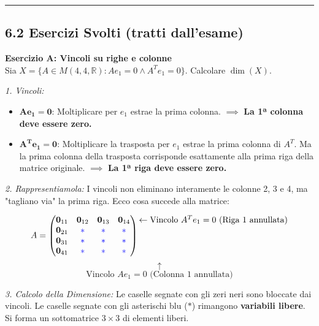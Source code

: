 \documentclass[10pt,a4paper]{article}
\begin{document}
\vspace{0.4cm}
\hrule
\vspace{0.4cm}

\subsection*{6.2 Esercizi Svolti (tratti dall'esame)}

\textbf{Esercizio A: Vincoli su righe e colonne}
\\ Sia $X = \{ A \in M(4,4, \mathbb{R}) : A e_1 = 0 \land A^T e_1 = 0 \}$. Calcolare $\dim(X)$.

\textit{1. Vincoli:}
\begin{itemize}
    \item $\mathbf{A e_1 = 0}$:
    Moltiplicare per $e_1$ estrae la prima colonna.
    $\implies$ \textbf{La 1ª colonna deve essere zero.}
    
    \item $\mathbf{A^T e_1 = 0}$:
    Moltiplicare la trasposta per $e_1$ estrae la prima colonna di $A^T$. Ma la prima colonna della trasposta corrisponde esattamente alla prima riga della matrice originale.
    $\implies$ \textbf{La 1ª riga deve essere zero.}
\end{itemize}

\textit{2. Rappresentiamola:}
I vincoli non eliminano interamente le colonne 2, 3 e 4, ma "tagliano via" la prima riga.
Ecco cosa succede alla matrice:

\[
A = \begin{pmatrix}
\mathbf{0}_{11} & \mathbf{0}_{12} & \mathbf{0}_{13} & \mathbf{0}_{14} \\
\mathbf{0}_{21} & \color{blue}* & \color{blue}* & \color{blue}* \\
\mathbf{0}_{31} & \color{blue}* & \color{blue}* & \color{blue}* \\
\mathbf{0}_{41} & \color{blue}* & \color{blue}* & \color{blue}*
\end{pmatrix}
\begin{matrix}
\leftarrow \text{Vincolo } A^T e_1 = 0 \text{ (Riga 1 annullata)} \\
\\
\\
\\
\end{matrix}
\]
\[
\uparrow
\]
\[
\text{Vincolo } A e_1 = 0 \text{ (Colonna 1 annullata)}
\]

\textit{3. Calcolo della Dimensione:}
Le caselle segnate con gli zeri neri sono bloccate dai vincoli.
Le caselle segnate con gli asterischi blu ($*$) rimangono \textbf{variabili libere}.
Si forma un sottomatrice $3 \times 3$ di elementi liberi.
\end{document}
